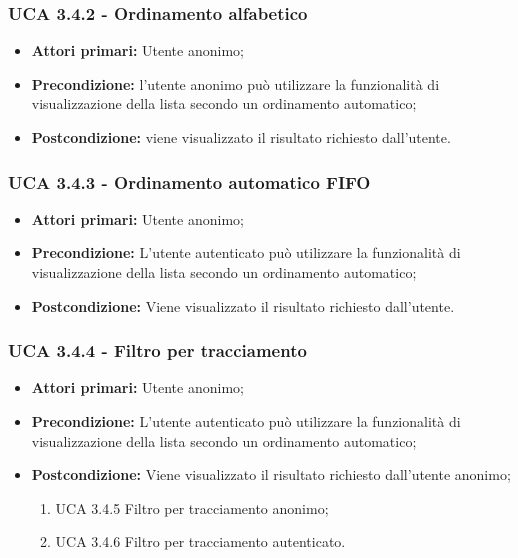 \subsubsection{UCA 3.4.2 - Ordinamento alfabetico}%
\begin{itemize}
	\item \textbf{Attori primari:} Utente anonimo;
	\item \textbf{Precondizione:} l’utente anonimo può utilizzare la funzionalità di visualizzazione della lista secondo un ordinamento automatico;
	\item \textbf{Postcondizione:} viene visualizzato il risultato richiesto dall’utente.
\end{itemize}

\subsubsection{UCA 3.4.3 - Ordinamento automatico FIFO}%
\begin{itemize}	
	\item \textbf{Attori primari:} Utente anonimo;
	\item \textbf{Precondizione:} L’utente autenticato può utilizzare la funzionalità di visualizzazione della lista secondo un ordinamento automatico;
	\item \textbf{Postcondizione:} Viene visualizzato il risultato richiesto dall’utente.
\end{itemize}

\subsubsection{UCA 3.4.4 - Filtro per tracciamento}%
\begin{itemize}
	\item \textbf{Attori primari:} Utente anonimo;
	\item \textbf{Precondizione:} L’utente autenticato può utilizzare la funzionalità di visualizzazione della lista secondo un ordinamento automatico;
	\item \textbf{Postcondizione:} Viene visualizzato il risultato richiesto dall’utente anonimo;
	\begin{enumerate}
		\item UCA 3.4.5 Filtro per tracciamento anonimo;
		\item UCA 3.4.6 Filtro per tracciamento autenticato.
	\end{enumerate}
\end{itemize}

